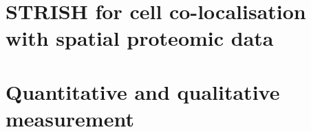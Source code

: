 
\section{STRISH for cell co-localisation with spatial proteomic data}
\label{Sec:3.3_STRISH2.0}	%



\section{Quantitative and qualitative measurement}
\label{Sec:3.4_validation}	%




